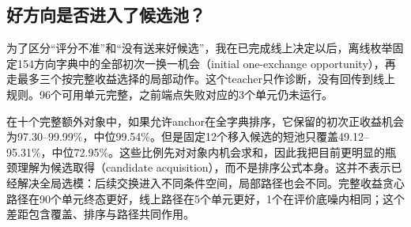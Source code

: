 \subsection{好方向是否进入了候选池？}
为了区分“评分不准”和“没有送来好候选”，我在已完成线上决定以后，离线枚举固定154方向字典中的全部初次一换一机会（initial one-exchange opportunity），再走最多三个按完整收益选择的局部动作。这个teacher只作诊断，没有回传到线上规则。96个可用单元完整，之前端点失败对应的3个单元仍未运行。

在十个完整额外对象中，如果允许anchor在全字典排序，它保留的初次正收益机会为97.30--99.99\%，中位99.54\%。但是固定12个移入候选的短池只覆盖49.12--95.31\%，中位72.95\%。这些比例先对对象内机会求和，因此我把目前更明显的瓶颈理解为候选取得（candidate acquisition），而不是排序公式本身。这并不表示已经解决全局选模：后续交换进入不同条件空间，局部路径也会不同。完整收益贪心路径在90个单元终态更好，线上路径在5个单元更好，1个在评价底噪内相同；这个差距包含覆盖、排序与路径共同作用。
